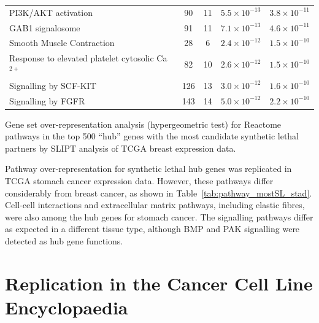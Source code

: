 \begin{table}[!ht]
{\begin{threeparttable}
\begin{tabular}{lcccc}
  \rowcolor{black!10}
  PI3K/AKT activation &  90 &  11 & $5.5 \times 10^{-13}$ & $3.8 \times 10^{-11}$ \\ 
  \rowcolor{black!5}
  GAB1 signalosome &  91 &  11 & $7.1 \times 10^{-13}$ & $4.6 \times 10^{-11}$ \\ 
  \rowcolor{black!10}
  Smooth Muscle Contraction &  28 &   6 & $2.4 \times 10^{-12}$ & $1.5 \times 10^{-10}$ \\ 
  \rowcolor{black!5}
  Response to elevated platelet cytosolic Ca$^{2+}$ &  82 &  10 & $2.6 \times 10^{-12}$ & $1.5 \times 10^{-10}$ \\ 
  \rowcolor{black!10}
  Signalling by SCF-KIT & 126 &  13 & $3.0 \times 10^{-12}$ & $1.6 \times 10^{-10}$ \\ 
  \rowcolor{black!5}
  Signalling by FGFR & 143 &  14 & $5.0 \times 10^{-12}$ & $2.2 \times 10^{-10}$ \\ 
   \hline
\end{tabular}
\begin{tablenotes}
\raggedright \small
Gene set over-representation analysis (hypergeometric test) for Reactome pathways in the top 500 ``hub'' genes with the most candidate synthetic lethal partners by \gls{SLIPT} analysis of TCGA breast expression data.
\end{tablenotes}
\end{threeparttable}
}
\end{table}

Pathway over-representation for synthetic lethal hub genes was replicated in TCGA stomach cancer expression data. However, these pathways differ considerably from breast cancer, as shown in Table~\ref{tab:pathway_mostSL_stad}. Cell-cell interactions and extracellular matrix pathways, including elastic fibres, were also among the hub genes for stomach cancer. The signalling pathways differ as expected in a different tissue type, although BMP and PAK signalling were detected as hub gene functions.

\FloatBarrier

\section{Replication in the Cancer Cell Line Encyclopaedia} \label{chapt3:CCLE}

\FloatBarrier

